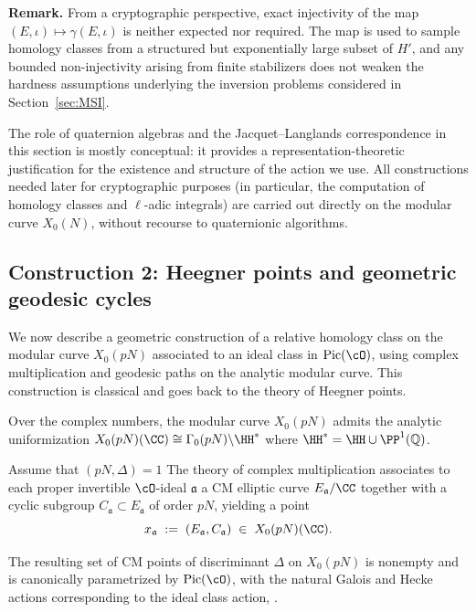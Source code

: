 \documentclass[10pt]{amsart}
\theoremstyle{theostyle}
\newcommand{\QQ}{\mathbb{Q}} \newcommand{\RR}{\mathbb{R}}
\renewcommand{\fa}{\mathfrak{a}} \newcommand{\fb}{\mathfrak{b}} \newcommand{\fc}{\mathfrak{c}}
\newcommand{\Pic}{\mathrm{Pic}}
\begin{document}
\medskip
\noindent\textbf{Remark.}
From a cryptographic perspective, exact injectivity of the map
$(E,\iota)\mapsto\gamma(E,\iota)$ is neither expected nor required.  The map is
used to sample homology classes from a structured but exponentially large
subset of $H'$, and any bounded non-injectivity arising from finite
stabilizers does not weaken the hardness assumptions underlying the inversion
problems considered in Section~\ref{sec:MSI}.
	
The role of quaternion algebras and the
Jacquet--Langlands correspondence in this section is mostly conceptual: it
provides a representation-theoretic justification for the existence and
structure of the action we use.  All constructions needed later for
	cryptographic purposes (in particular, the computation of homology classes
	and $\ell$-adic integrals) are carried out directly on the modular curve $X_0(N)$,
	without recourse to quaternionic algorithms.


\subsection{Construction 2: Heegner points and geometric geodesic cycles}
\label{subsec:constr2}

We now describe a geometric construction of a relative homology class on the
modular curve $X_0(pN)$ associated to an ideal class in $\Pic(\cO)$, using
complex multiplication and geodesic paths on the analytic modular curve.
This construction is classical and goes back to the theory of Heegner points.

Over the complex numbers, the modular curve $X_0(pN)$ admits the analytic
uniformization $X_0(pN)(\CC)\cong
\Gamma_0(pN)\backslash \HH^\ast$ where $\HH^\ast = \HH \cup \PP^1(\QQ)$.


Assume that $(pN,\Delta)=1$ 
The theory of complex multiplication associates to each proper
invertible $\cO$-ideal $\fa$ a CM elliptic curve $E_\fa/\CC$ together with
a cyclic subgroup $C_\fa\subset E_\fa$ of order $pN$, yielding a point
\[
x_\fa \;:=\; (E_\fa, C_\fa) \;\in\; X_0(pN)(\CC).
\]

The resulting set of CM points of discriminant $\Delta$ on $X_0(pN)$ is
nonempty and is canonically parametrized by $\Pic(\cO)$, with the natural
Galois and Hecke actions corresponding to the ideal class action, \cite[Ch. 3]{Darmon:RatPts}.
\end{document}
